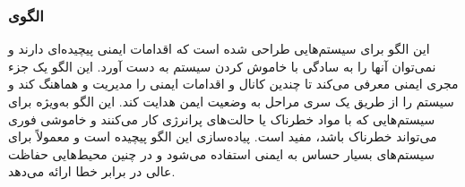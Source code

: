 \subsubsection{الگوی }
\label{archSafeSafetyExecSec}
\begin{RTL}
این الگو برای سیستم‌هایی طراحی شده است که اقدامات ایمنی پیچیده‌ای دارند
و نمی‌توان آنها را به سادگی با خاموش کردن سیستم به دست آورد.
این الگو یک جزء مجری ایمنی معرفی می‌کند تا چندین کانال
و اقدامات ایمنی را مدیریت و هماهنگ کند و سیستم را از طریق
یک سری مراحل به وضعیت ایمن هدایت کند. این الگو به‌ویژه برای سیستم‌هایی
که با مواد خطرناک یا حالت‌های پرانرژی کار می‌کنند و خاموشی فوری می‌تواند
خطرناک باشد، مفید است. پیاده‌سازی این الگو پیچیده است و معمولاً
برای سیستم‌های بسیار حساس به ایمنی استفاده می‌شود و در
چنین محیط‌هایی حفاظت عالی در برابر خطا ارائه می‌دهد.
\end{RTL}